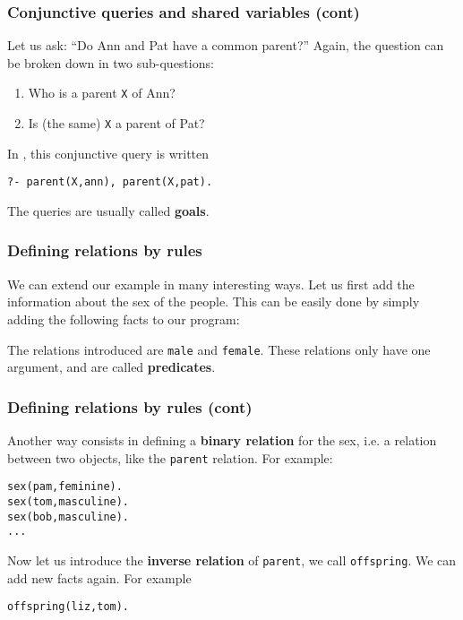 %
\begin{frame}[containsverbatim]
\frametitle{Conjunctive queries and shared variables (cont)}

Let us ask: ``Do Ann and Pat have a common parent?'' Again, the
question can be broken down in two sub-questions:
\begin{enumerate}

  \item Who is a parent \texttt{X} of Ann?

  \item Is (the same) \texttt{X} a parent of Pat?

\end{enumerate}
In \Prolog, this conjunctive query is written
{\small
\begin{verbatim}
?- parent(X,ann), parent(X,pat).
\end{verbatim}
}
The \Prolog queries are usually called \textbf{goals}.

\end{frame}

%
\begin{frame}
\frametitle{Defining relations by rules}

We can extend our example in many interesting ways. Let us first add
the information about the sex of the people. This can be easily done
by simply adding the following facts to our program:


The relations introduced are \texttt{male} and \texttt{female}. These
relations only have one argument, and are called \textbf{predicates}.

\end{frame}

%
\begin{frame}[containsverbatim]
\frametitle{Defining relations by rules (cont)}

Another way consists in defining a \textbf{binary relation} for the
sex, i.e. a relation between two objects, like the \texttt{parent}
relation. For example:
{\small
\begin{verbatim}
sex(pam,feminine).
sex(tom,masculine).
sex(bob,masculine).
...
\end{verbatim}
}
Now let us introduce the \textbf{inverse relation} of \texttt{parent},
we call \texttt{offspring}. We can add new facts again. For example
{\small
\begin{verbatim}
offspring(liz,tom).
\end{verbatim}
}

\end{frame}

